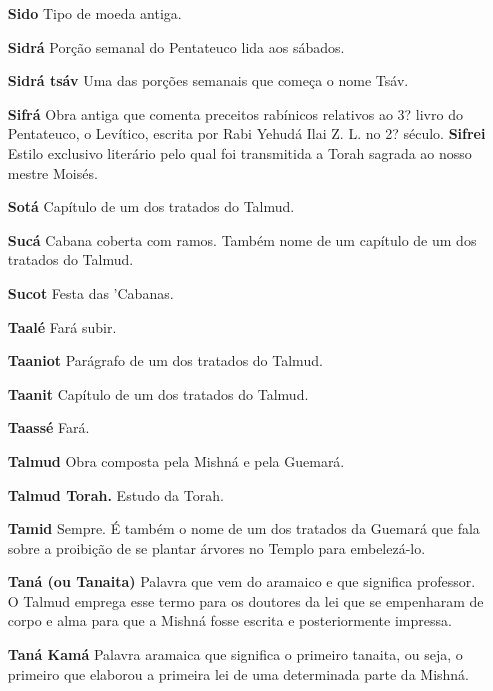 \begin{itemize}
\begin{enumrate}
\begin{itemize}
\begin{itemize}
\begin{itemize}
\begin{itemize}
\begin{itemize}
\item[\textbf{Sido}] Tipo de moeda antiga.

\item[\textbf{Sidrá}] Porção semanal do Pentateu­co lida aos sábados.

\item[\textbf{Sidrá tsáv}] Uma das porções sema­nais que começa o nome Tsáv.

\item[\textbf{Sifrá}] Obra antiga que comenta pre­ceitos rabínicos relativos
ao 3? livro do Pentateuco, o Levítico, escrita por Ra­bi Yehudá Ilai Z.
L. no 2? século. \textbf{Sifrei} Estilo exclusivo literário pelo qual
foi transmitida a Torah sagrada ao nosso mestre Moisés.

\item[\textbf{Sotá}] Capítulo de um dos tratados do Talmud.

\item[\textbf{Sucá}] Cabana coberta com ramos. Também nome de um capítulo de um dos
tratados do Talmud.

\item[\textbf{Sucot}] Festa das 'Cabanas.

\item[\textbf{Taalé}] Fará subir.

\item[\textbf{Taaniot}] Parágrafo de um dos trata­dos do Talmud.

\item[\textbf{Taanit}] Capítulo de um dos tratados do Talmud.

\item[\textbf{Taassé}] Fará.

\item[\textbf{Talmud}] Obra composta pela Mish­ná e pela Guemará.

\item[\textbf{Talmud Torah.}] Estudo da Torah.


\item[\textbf{Tamid}] Sempre. É também o nome de um dos tratados da Guemará que fala
sobre a proibição de se plantar árvo­res no Templo para embelezá-lo.

\item[\textbf{Taná (ou Tanaita)}] Palavra que vem do aramaico e que significa
professor. O Talmud emprega esse termo para os doutores da lei que se
empenharam de corpo e alma para que a Mishná fosse escrita e
posteriormente impressa.

\item[\textbf{Taná Kamá}] Palavra aramaica que sig­nifica o primeiro tanaita,
ou seja, o pri­meiro que elaborou a primeira lei de uma determinada
parte da Mishná.


\end{itemize}
\end{itemize}
\end{itemize}
\end{itemize}
\end{itemize}
\end{enumrate}
\end{itemize}
